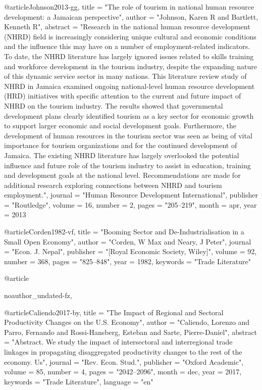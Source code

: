 {@article{Johnson2013-gg,
	title     = "The role of tourism in national human resource development: a
	Jamaican perspective",
	author    = "Johnson, Karen R and Bartlett, Kenneth R",
	abstract  = "Research in the national human resource development (NHRD) field
	is increasingly considering unique cultural and economic
	conditions and the influence this may have on a number of
	employment-related indicators. To date, the NHRD literature has
	largely ignored issues related to skills training and workforce
	development in the tourism industry, despite the expanding
	nature of this dynamic service sector in many nations. This
	literature review study of NHRD in Jamaica examined ongoing
	national-level human resource development (HRD) initiatives with
	specific attention to the current and future impact of NHRD on
	the tourism industry. The results showed that governmental
	development plans clearly identified tourism as a key sector for
	economic growth to support larger economic and social
	development goals. Furthermore, the development of human
	resources in the tourism sector was seen as being of vital
	importance for tourism organizations and for the continued
	development of Jamaica. The existing NHRD literature has largely
	overlooked the potential influence and future role of the
	tourism industry to assist in education, training and
	development goals at the national level. Recommendations are
	made for additional research exploring connections between NHRD
	and tourism employment.",
	journal   = "Human Resource Development International",
	publisher = "Routledge",
	volume    =  16,
	number    =  2,
	pages     = "205--219",
	month     =  apr,
	year      =  2013
}

@article{Corden1982-vf,
	title     = "Booming Sector and {De-Industrialisation} in a Small Open
	Economy",
	author    = "Corden, W Max and Neary, J Peter",
	journal   = "Econ. J. Nepal",
	publisher = "[Royal Economic Society, Wiley]",
	volume    =  92,
	number    =  368,
	pages     = "825--848",
	year      =  1982,
	keywords  = "Trade Literature"
}

@article{noauthor_undated-fz,
	
}

@article{Caliendo2017-by,
	title     = "The Impact of Regional and Sectoral Productivity Changes on the
	{U.S}. Economy",
	author    = "Caliendo, Lorenzo and Parro, Fernando and Rossi-Hansberg,
	Esteban and Sarte, Pierre-Daniel",
	abstract  = "Abstract. We study the impact of intersectoral and interregional
	trade linkages in propagating disaggregated productivity changes
	to the rest of the economy. Us",
	journal   = "Rev. Econ. Stud.",
	publisher = "Oxford Academic",
	volume    =  85,
	number    =  4,
	pages     = "2042--2096",
	month     =  dec,
	year      =  2017,
	keywords  = "Trade Literature",
	language  = "en"
}

}
